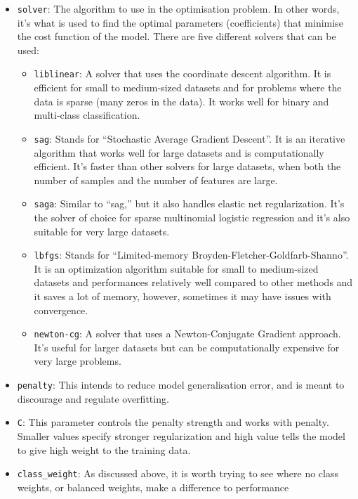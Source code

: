 \documentclass[
  letterpaper,
  DIV=11,
  numbers=noendperiod]{scrreprt}
\providecommand{\tightlist}{%
  \setlength{\itemsep}{0pt}\setlength{\parskip}{0pt}}\usepackage{longtable,booktabs,array}
\begin{document}
\begin{itemize}
\tightlist
\item
  \texttt{solver}: The algorithm to use in the optimisation problem. In
  other words, it's what is used to find the optimal parameters
  (coefficients) that minimise the cost function of the model. There are
  five different solvers that can be used:

  \begin{itemize}
  \tightlist
  \item
    \texttt{liblinear}: A solver that uses the coordinate descent
    algorithm. It is efficient for small to medium-sized datasets and
    for problems where the data is sparse (many zeros in the data). It
    works well for binary and multi-class classification.
  \item
    \texttt{sag}: Stands for ``Stochastic Average Gradient Descent''. It
    is an iterative algorithm that works well for large datasets and is
    computationally efficient. It's faster than other solvers for large
    datasets, when both the number of samples and the number of features
    are large.
  \item
    \texttt{saga}: Similar to ``sag,'' but it also handles elastic net
    regularization. It's the solver of choice for sparse multinomial
    logistic regression and it's also suitable for very large datasets.
  \item
    \texttt{lbfgs}: Stands for ``Limited-memory
    Broyden-Fletcher-Goldfarb-Shanno''. It is an optimization algorithm
    suitable for small to medium-sized datasets and performances
    relatively well compared to other methods and it saves a lot of
    memory, however, sometimes it may have issues with convergence.
  \item
    \texttt{newton-cg}: A solver that uses a Newton-Conjugate Gradient
    approach. It's useful for larger datasets but can be computationally
    expensive for very large problems.
  \end{itemize}
\item
  \texttt{penalty}: This intends to reduce model generalisation error,
  and is meant to discourage and regulate overfitting.
\item
  \texttt{C}: This parameter controls the penalty strength and works
  with penalty. Smaller values specify stronger regularization and high
  value tells the model to give high weight to the training data.
\item
  \texttt{class\_weight}: As discussed above, it is worth trying to see
  where no class weights, or balanced weights, make a difference to
  performance
\end{itemize}
\end{document}

